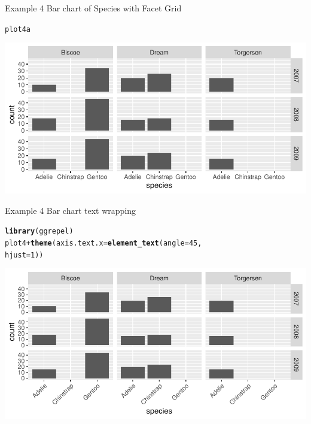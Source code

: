 \documentclass{beamer}\usepackage[]{graphicx}\usepackage[]{xcolor}
\makeatletter
\newcommand{\hlnum}[1]{\textcolor[rgb]{0.686,0.059,0.569}{#1}}%
\newcommand{\hlopt}[1]{\textcolor[rgb]{0,0,0}{#1}}%
\newcommand{\hlstd}[1]{\textcolor[rgb]{0.345,0.345,0.345}{#1}}%
\newcommand{\hlkwc}[1]{\textcolor[rgb]{0.333,0.667,0.333}{#1}}%
\newcommand{\hlkwd}[1]{\textcolor[rgb]{0.737,0.353,0.396}{\textbf{#1}}}%
\newenvironment{kframe}{%
 \def\at@end@of@kframe{}%
 \ifinner\ifhmode%
  \def\at@end@of@kframe{\end{minipage}}%
  \begin{minipage}{\columnwidth}%
 \fi\fi%
 \def\FrameCommand##1{\hskip\@totalleftmargin \hskip-\fboxsep
 \colorbox{shadecolor}{##1}\hskip-\fboxsep
     \hskip-\linewidth \hskip-\@totalleftmargin \hskip\columnwidth}%
 \MakeFramed {\advance\hsize-\width
   \@totalleftmargin\z@ \linewidth\hsize
   \@setminipage}}%
 {\par\unskip\endMakeFramed%
 \at@end@of@kframe}
\newenvironment{knitrout}{}{} %
\makeatother
\begin{document}
\begin{frame}[fragile]{Example 4 Bar chart of Species with Facet Grid }
\begin{knitrout}
\color{fgcolor}\begin{kframe}
\begin{alltt}
\hlstd{plot4a}
\end{alltt}
\end{kframe}
\includegraphics[width=0.95\linewidth]{figure/unnamed-chunk-22-1} 
\end{knitrout}
\end{frame}
\begin{frame}[fragile]{Example 4 Bar chart text wrapping }
\begin{knitrout}
\color{fgcolor}\begin{kframe}
\begin{alltt}
\hlkwd{library}\hlstd{(ggrepel)}
\hlstd{plot4} \hlopt{+} \hlkwd{theme}\hlstd{(}\hlkwc{axis.text.x} \hlstd{=} \hlkwd{element_text}\hlstd{(}\hlkwc{angle} \hlstd{=} \hlnum{45}\hlstd{,}
    \hlkwc{hjust} \hlstd{=} \hlnum{1}\hlstd{))}
\end{alltt}
\end{kframe}
\includegraphics[width=0.95\linewidth]{figure/unnamed-chunk-23-1} 
\end{knitrout}
\end{frame}
\end{document}
